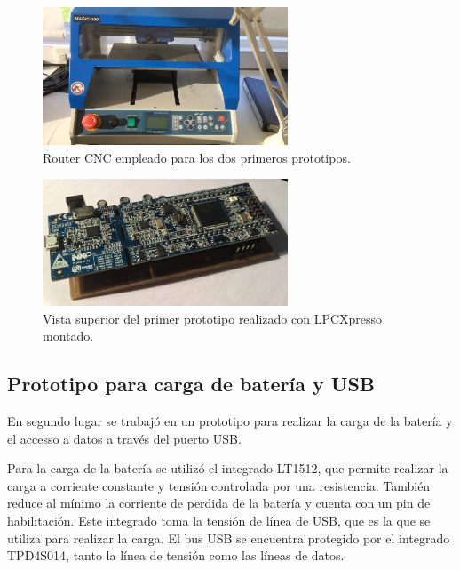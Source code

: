 \begin{figure}[!htbp]
	\centering
	
	\includegraphics[width=0.65\textwidth]{./Figures/magic300.jpeg}		
	
	\caption{Router CNC empleado para los dos primeros prototipos.}
	\label{fig:magic300}
\end{figure}

\begin{figure}[!htbp]
	\centering
	\includegraphics[width=0.65\textwidth]{./Figures/prototipo11.jpeg}		
	\caption{Vista superior del primer prototipo realizado con LPCXpresso montado.}
	\label{fig:prototipo1sup}
\end{figure}


\subsection{Prototipo para carga de batería y USB}

En segundo lugar se trabajó en un prototipo para realizar la carga de la batería y el accesso a datos a través del puerto USB. 

Para la carga de la batería se utilizó el integrado LT1512, que permite realizar la carga a corriente constante y tensión controlada por una resistencia. También reduce al mínimo la corriente de perdida de la batería y cuenta con un pin de habilitación. Este integrado toma la tensión de línea de USB, que es la que se utiliza para realizar la carga. El bus USB se encuentra protegido por el integrado TPD4S014, tanto la línea de tensión como las líneas de datos.


